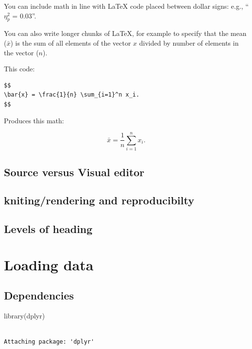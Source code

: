 \documentclass[
  letterpaper,
  DIV=11,
  numbers=noendperiod]{scrreprt}
\newenvironment{Shaded}{\begin{snugshade}}{\end{snugshade}}
\newcommand{\FunctionTok}[1]{\textcolor[rgb]{0.28,0.35,0.67}{#1}}
\newcommand{\NormalTok}[1]{\textcolor[rgb]{0.00,0.23,0.31}{#1}}
\begin{document}
You can include math in line with LaTeX code placed between dollar
signs: e.g., ``\(\eta_{p}^{2}\) = 0.03''.

You can also write longer chunks of LaTeX, for example to specify that
the mean (\(\bar{x}\)) is the sum of all elements of the vector \(x\)
divided by number of elements in the vector (\(n\)).

This code:

\begin{verbatim}
$$
\bar{x} = \frac{1}{n} \sum_{i=1}^n x_i.
$$
\end{verbatim}

Produces this math:

\[
\bar{x} = \frac{1}{n} \sum_{i=1}^n x_i.
\]

\section{Source versus Visual editor}\label{source-versus-visual-editor}

\section{kniting/rendering and
reproducibilty}\label{knitingrendering-and-reproducibilty}

\TODO

\section{Levels of heading}\label{levels-of-heading}

\TODO


\chapter{Loading data}\label{loading-data}

\section{Dependencies}\label{dependencies-1}

\begin{Shaded}
\begin{Highlighting}[]
\FunctionTok{library}\NormalTok{(dplyr)}
\end{Highlighting}
\end{Shaded}

\begin{verbatim}

Attaching package: 'dplyr'
\end{verbatim}
\end{document}
